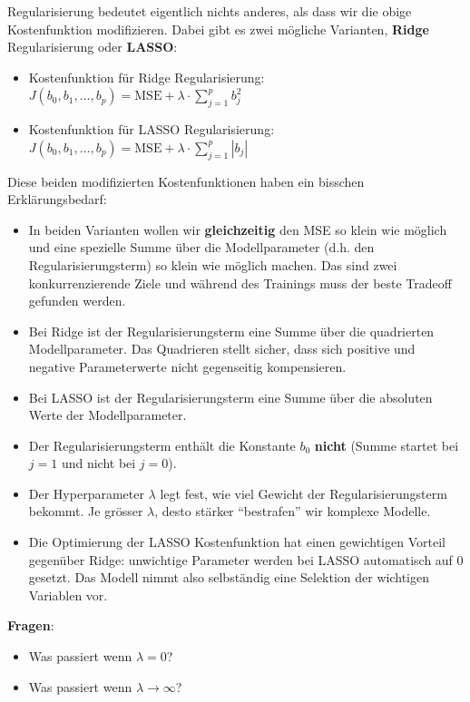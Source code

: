 \documentclass[
]{book}
\providecommand{\tightlist}{%
  \setlength{\itemsep}{0pt}\setlength{\parskip}{0pt}}
\begin{document}
Regularisierung bedeutet eigentlich nichts anderes, als dass wir die obige Kostenfunktion modifizieren. Dabei gibt es zwei mögliche Varianten, \textbf{Ridge} Regularisierung oder \textbf{LASSO}:

\begin{itemize}
\tightlist
\item
  Kostenfunktion für Ridge Regularisierung: \(J(b_0,b_1,\dots,b_p) = \text{MSE} + \lambda \cdot \sum_{j=1}^p b_j^2\)
\item
  Kostenfunktion für LASSO Regularisierung: \(J(b_0,b_1,\dots,b_p) = \text{MSE} + \lambda \cdot \sum_{j=1}^p |b_j|\)
\end{itemize}

Diese beiden modifizierten Kostenfunktionen haben ein bisschen Erklärungsbedarf:

\begin{itemize}
\tightlist
\item
  In beiden Varianten wollen wir \textbf{gleichzeitig} den MSE so klein wie möglich und eine spezielle Summe über die Modellparameter (d.h. den Regularisierungsterm) so klein wie möglich machen. Das sind zwei konkurrenzierende Ziele und während des Trainings muss der beste Tradeoff gefunden werden.
\item
  Bei Ridge ist der Regularisierungsterm eine Summe über die quadrierten Modellparameter. Das Quadrieren stellt sicher, dass sich positive und negative Parameterwerte nicht gegenseitig kompensieren.
\item
  Bei LASSO ist der Regularisierungsterm eine Summe über die absoluten Werte der Modellparameter.
\item
  Der Regularisierungsterm enthält die Konstante \(b_0\) \textbf{nicht} (Summe startet bei \(j=1\) und nicht bei \(j=0\)).
\item
  Der Hyperparameter \(\lambda\) legt fest, wie viel Gewicht der Regularisierungsterm bekommt. Je grösser \(\lambda\), desto stärker ``bestrafen'' wir komplexe Modelle.
\item
  Die Optimierung der LASSO Kostenfunktion hat einen gewichtigen Vorteil gegenüber Ridge: unwichtige Parameter werden bei LASSO automatisch auf 0 gesetzt. Das Modell nimmt also selbständig eine Selektion der wichtigen Variablen vor.
\end{itemize}

\textbf{Fragen}:

\begin{itemize}
\tightlist
\item
  Was passiert wenn \(\lambda=0\)?
\item
  Was passiert wenn \(\lambda \rightarrow \infty\)?
\end{itemize}
\end{document}
